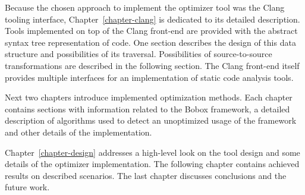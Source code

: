 Because the chosen approach to implement the optimizer tool was the Clang tooling interface, Chapter~\ref{chapter-clang} is dedicated to its detailed description. Tools implemented on top of the Clang front-end are provided with the abstract syntax tree representation of code. One section describes the design of this data structure and possibilities of its traversal. Possibilities of source-to-source transformations are described in the following section. The Clang front-end itself provides multiple interfaces for an implementation of static code analysis tools.

Next two chapters introduce implemented optimization methods. Each chapter contains sections with information related to the Bobox framework, a detailed description of algorithms used to detect an unoptimized usage of the framework and other details of the implementation.

Chapter~\ref{chapter-design} addresses a high-level look on the tool design and some details of the optimizer implementation. The following chapter contains achieved results on described scenarios. The last chapter discusses conclusions and the future work.